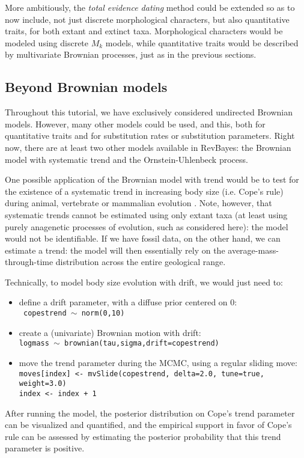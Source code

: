 \documentclass[usletter]{article}
\newcommand{\cmd}[1]{\texttt{#1}}
\begin{document}
More ambitiously, the \emph{total evidence dating} method \citep{Ronquist:2012ea} could be extended so as to now include, not just discrete morphological characters, but also quantitative traits, for both extant and extinct taxa. Morphological characters would be modeled using discrete $M_k$ models, while quantitative traits would be described by multivariate Brownian processes, just as in the previous sections.

\subsection*{Beyond Brownian models}

Throughout this tutorial, we have exclusively considered undirected Brownian models.
However, many other models could be used,
and this,
both for quantitative traits and for substitution rates or substitution parameters.
Right now, there are at least two other models available in RevBayes:
the Brownian model with systematic trend and the Ornstein-Uhlenbeck process.

One possible application of the Brownian model with trend would be to test for the existence of a systematic trend in increasing body size (i.e. Cope's rule) during animal, vertebrate or mammalian evolution \citep{Alroy:1998p270}. Note, however, that systematic trends cannot be estimated using only extant taxa (at least using purely anagenetic processes of evolution, such as considered here): the model would not be identifiable.
If we have fossil data, on the other hand, we can estimate a trend:
the model will then essentially rely on the average-mass-through-time distribution across the entire geological range.

Technically, to model body size evolution with drift, we would just need to:
\begin{itemize}
\item
define a drift parameter, with a diffuse prior centered on 0:
\\
\cmd{
copestrend $\sim$ norm(0,10)
}
\item
create a (univariate) Brownian motion with drift:
\\
\cmd{logmass $\sim$ brownian(tau,sigma,drift=copestrend)}
\item
move the trend parameter during the MCMC, using a regular sliding move:
\\
\cmd{moves[index] <- mvSlide(copestrend, delta=2.0, tune=true, weight=3.0)
\\
index <- index + 1}
\end{itemize}
After running the model, the posterior distribution on Cope's trend parameter can be visualized and quantified, and the empirical support in favor of Cope's rule can be assessed by estimating the posterior probability that this trend parameter is positive.





\end{document}
